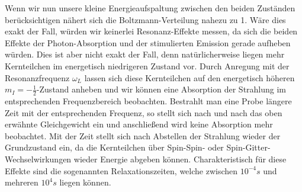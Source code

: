 Wenn wir nun unsere kleine Energieaufspaltung zwischen den beiden Zuständen berücksichtigen nähert sich die Boltzmann-Verteilung nahezu zu 1. Wäre dies exakt der Fall, würden wir keinerlei Resonanz-Effekte messen, da sich die beiden Effekte der Photon-Absorption und der stimulierten Emission gerade aufheben würden. Dies ist aber nicht exakt der Fall, denn natürlicherweise liegen mehr Kernteilchen im energetisch niedrigeren Zustand vor. Durch Anregung mit der Resonanzfrequenz $\omega_L$ lassen sich diese Kernteilchen auf den energetisch höheren $m_I=-\frac{1}{2}$-Zustand anheben und wir können eine Absorption der Strahlung im entsprechenden Frequenzbereich beobachten. Bestrahlt man eine Probe längere Zeit mit der entsprechenden Frequenz, so stellt sich nach und nach das oben erwähnte Gleichgewicht ein und anschließend wird keine Absorption mehr  beobachtet. Mit der Zeit stellt sich nach Abstellen der Strahlung wieder der Grundzustand ein, da die Kernteilchen über Spin-Spin- oder Spin-Gitter-Wechselwirkungen wieder Energie abgeben können. Charakteristisch für diese Effekte sind die sogenannten Relaxationszeiten, welche zwischen $10^{-4}s$ und mehreren $10^4s$ liegen können.